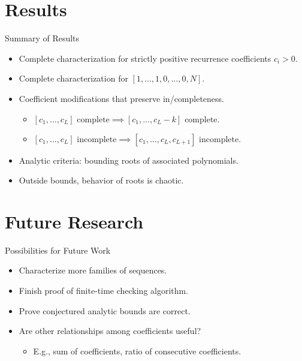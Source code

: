 \documentclass[handout]{beamer}
\theoremstyle{example}
\begin{document}
\section{Results}
\begin{frame}{Summary of Results}
	\begin{itemize}\setlength{\itemsep}{3ex}
		\item Complete characterization for strictly positive recurrence coefficients $c_i > 0$.
		
		\item Complete characterization for $[1, \ldots, 1, 0, \ldots, 0, N]$.
		
		\pause
		\item Coefficient modifications that preserve in/completeness.
			\begin{itemize}\setlength{\itemsep}{1.5ex}
				\item $[c_1, \ldots, c_L] \text{ complete} \implies [c_1, \ldots, c_L -k] \text{ complete.}$
				\item $[c_1, \ldots, c_L] \text{ incomplete} \implies [c_1, \ldots, c_L, c_{L + 1}] \text{ incomplete.}$
			\end{itemize}
		
		\pause
		\item Analytic criteria: bounding roots of associated polynomials.
		
		\item Outside bounds, behavior of roots is chaotic.
	\end{itemize}
\end{frame}

\section{Future Research}
\begin{frame}{Possibilities for Future Work}
	\begin{itemize}\setlength{\itemsep}{3ex}
		\item Characterize more families of sequences.
		
		\pause
		\item Finish proof of finite-time checking algorithm.
		
		\pause
		\item Prove conjectured analytic bounds are correct.
		
		\pause
		\item Are other relationships among coefficients useful?
			\begin{itemize}
				\item E.g., sum of coefficients, ratio of consecutive coefficients.
			\end{itemize}
	\end{itemize}
\end{frame}
\end{document}
